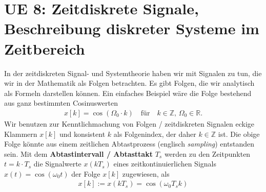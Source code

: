 \clearpage
\section{UE 8: Zeitdiskrete Signale, Beschreibung diskreter Systeme im Zeitbereich}
\label{sec:ue8_dt_systems_intro_conv}
%
In der zeitdiskreten Signal- und Systemtheorie haben wir mit Signalen zu tun,
die wir in der Mathematik als Folgen betrachten. Es gibt Folgen, die wir analytisch
als Formeln darstellen können.
Ein einfaches Beispiel wäre die Folge bestehend aus ganz bestimmten Cosinuswerten
\begin{align}
x[k] = \cos(\Omega_0 \cdot k)\quad\text{für}\quad k\in\mathbb{Z},\,\Omega_0\in\mathbb{R}.
\end{align}
Wir benutzen zur Kenntlichmachung von Folgen / zeitdiskreten Signalen eckige
Klammern $x[k]$ und konsistent $k$ als Folgenindex, der daher $k\in\mathbb{Z}$ ist.
%
Die obige Folge könnte aus einem zeitlichen Abtastprozess (englisch \textit{sampling})
entstanden sein. Mit dem
\textbf{Abtastintervall / Abtasttakt} $T_s$ werden zu den Zeitpunkten $t = k \cdot T_s$
die Signalwerte $x(k T_s)$ eines zeitkontinuierlichen Signals $x(t) = \cos(\omega_0 t)$
der Folge $x[k]$ zugewiesen, als
\begin{align}
x[k] := x(k T_s) = \cos(\omega_0 T_s k)
\end{align}

